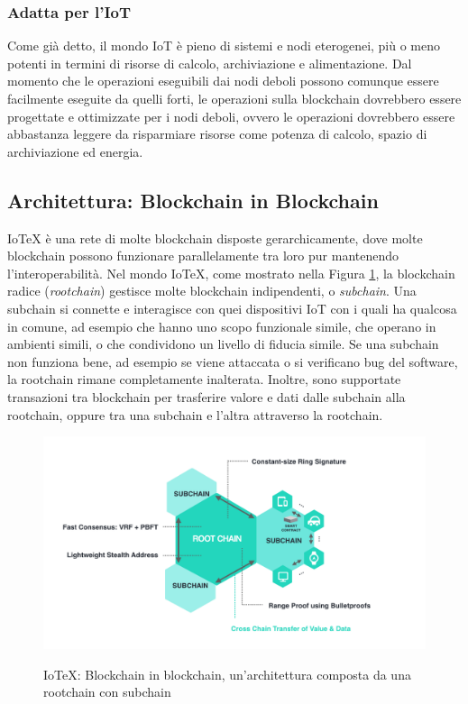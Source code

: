 \subsubsection{Adatta per l'IoT}
Come già detto, il mondo IoT è pieno di sistemi e nodi eterogenei, più o meno potenti in termini di risorse di calcolo, archiviazione e alimentazione. Dal momento che le operazioni eseguibili dai nodi deboli possono comunque essere facilmente eseguite da quelli forti, le operazioni sulla blockchain dovrebbero essere progettate e ottimizzate per i nodi deboli, ovvero le operazioni dovrebbero essere abbastanza leggere da risparmiare risorse come potenza di calcolo, spazio di archiviazione ed energia.

\subsection{Architettura: Blockchain in Blockchain}
IoTeX è una rete di molte blockchain disposte gerarchicamente, dove molte blockchain possono funzionare parallelamente tra loro pur mantenendo l'interoperabilità. Nel mondo IoTeX, come mostrato nella Figura \ref{fig:fig1}, la blockchain radice (\emph{rootchain}) gestisce molte blockchain indipendenti, o \emph{subchain}. Una subchain si connette e interagisce con quei dispositivi IoT con i quali ha qualcosa in comune, ad esempio che hanno uno scopo funzionale simile, che operano in ambienti simili, o che condividono un livello di fiducia simile. Se una subchain non funziona bene, ad esempio se viene attaccata o si verificano bug del software, la rootchain rimane completamente inalterata. Inoltre, sono supportate transazioni tra blockchain per trasferire valore e dati dalle subchain alla rootchain, oppure tra una subchain e l'altra attraverso la rootchain.

\begin{figure}[ht]
	\includegraphics[width=\textwidth]{Figura1.png}
	\label{fig:fig1}
	\caption{IoTeX: Blockchain in blockchain, un'architettura composta da una rootchain con subchain}
\end{figure}


